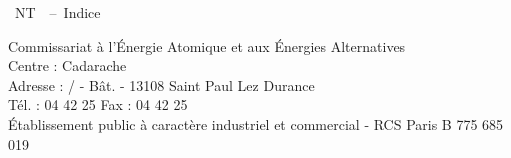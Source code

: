 {\begin{center}
    \vspace{38mm}

    {\fontsize{16}{20}\selectfont\Protype}

    \vspace{42mm}

    {\large\Prospecification~NT~\Pronumero~--~Indice \Proindice}

    \vspace{3mm}

    {\large\bf\Prodate}

    \vspace{11mm}

    {\fontsize{16}{20}\selectfont\scshape\Proauteurs}
    
    
  \end{center}

  \vspace{49mm}

  \begin{flushleft}
    \fontsize{6}{7}\selectfont%
    Commissariat \`a l'\'Energie Atomique et aux \'Energies Alternatives\\
    Centre : Cadarache\\
    Adresse : \Prodepartement/\Proservice\ifthenelse{\isundefined{\Prolaboratoiretitre}}{}{/\Prolaboratoire} - B\^at. {\Probatiment} - 13108 Saint Paul Lez Durance\\
    T\'el. : 04 42 25 {\Protelephone} \hspace{2.5mm} Fax : 04 42 25 {\Profax} \\
    \'Etablissement public \`a caract\`ere industriel et commercial - RCS Paris B 775 685 019
  \end{flushleft}

  \newpage
}


